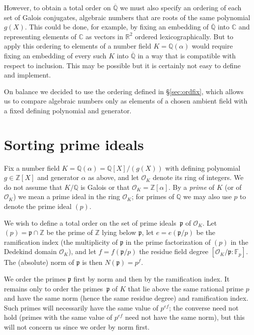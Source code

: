 \documentclass{article}
\def\Sage{{\tt Sage}}
\def\Z{{\mathbb Z}}
\def\Q{{\mathbb Q}}
\def\R{{\mathbb R}}
\def\C{{\mathbb C}}
\def\F{{\mathbb F}}
\def\OO{{\mathcal O}}
\def\p{{\mathfrak p}}
\def\Qbar{\overline{\Q}}
\begin{document}
However, to obtain a total order on $\Qbar$ we must also specify
an ordering of each set of Galois conjugates, algebraic numbers
that are roots of the same polynomial $g(X)$.  This could be done, for example, by fixing an
embedding of $\Qbar$ into $\C$ and representing elements of $\C$ as
vectors in $\R^2$ ordered lexicographically. But to apply this ordering to
elements of a number field $K=\Q(\alpha)$ would require fixing an
embedding of every such $K$ into $\Qbar$ in a way that is compatible
with respect to inclusion.  This may be possible but it
is certainly not easy to define and implement.

On balance we decided to use the ordering defined in \S\ref{sec:ordfix}, which allows us to compare algebraic numbers only as elements of a chosen ambient field with a fixed defining polynomial and generator.

\section{Sorting prime ideals}\label{sec:primes}
Fix a number field $K=\Q(\alpha)=\Q[X]/(g(X))$ with defining polynomial
$g\in\Z[X]$ and generator $\alpha$ as above, and let $\OO_K$ denote its ring of integers.
We do not assume that $K/\Q$ is Galois or that $\OO_K=\Z[\alpha]$.
By a \emph{prime} of $K$ (or of $\OO_K$) we mean a prime ideal in the ring $\OO_K$; for primes of $\Q$ we may also use $p$ to denote the prime ideal $(p)$.

We wish to define a total order on the set of prime ideals~$\p$
of $\OO_K$.  Let $(p)=\p\cap \Z$ be the prime of $\Z$ lying below $\p$,
let $e=e(\p/p)$ be the ramification index (the multiplicity of $\p$ in the prime factorization of $(p)$ in the Dedekind domain $\OO_K$), and let $f=f(\p/p)$ the residue field degree $[\OO_K/\p:\F_p]$.
The (absolute) norm of $\p$ is then $N(\p)=p^f$.


We order the primes $\p$ first by norm and then by the ramification index.
It remains only to order the primes~$\p$ of $K$ that lie above the same rational prime $p$ and have the same norm (hence the same residue degree) and ramification index.  Such primes will necessarily have the same value of $p^{ef}$; the converse need not hold (primes with the same value of $p^{ef}$ need not have the same norm), but this will not concern us since we order by norm first.
\end{document}
